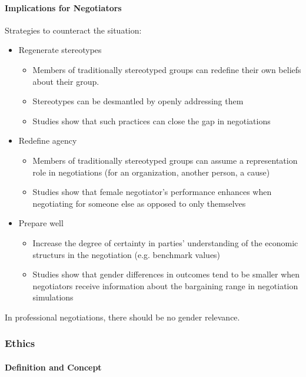 \paragraph{Implications for Negotiators}
Strategies to counteract the situation:
\begin{itemize}
    \item Regenerate stereotypes
        \begin{itemize}
            \item Members of traditionally stereotyped groups can redefine their
                own beliefs about their group.
            \item Stereotypes can be desmantled by openly addressing them
            \item Studies show that such practices can close the gap in
                negotiations
        \end{itemize}
    \item Redefine agency
        \begin{itemize}
            \item Members of traditionally stereotyped groups can assume
                a representation role in negotiations (for an organization,
                another person, a cause)
            \item Studies show that female negotiator's performance enhances
                when negotiating for someone else as opposed to only
                themselves
        \end{itemize}
    \item Prepare well
        \begin{itemize}
            \item Increase the degree of certainty in parties' understanding
                of the economic structurs in the negotiation (e.g. benchmark
                values)
            \item Studies show that gender differences in outcomes tend
                to be smaller when negotiators receive information about
                the bargaining range in negotiation simulations
        \end{itemize}
\end{itemize}
In professional negotiations, there should be no gender relevance.

\subsubsection{Ethics}

\paragraph{Definition and Concept}

